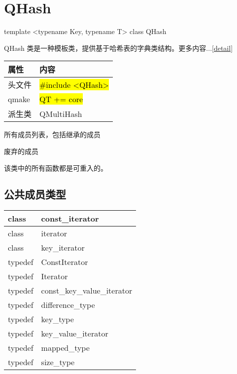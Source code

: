 \chapter{QHash}\label{hash}

template <typename Key, typename T> class QHash

QHash 类是一种模板类，提供基于哈希表的字典类结构。更多内容...\ref{detail}


\begin{tabular}{|l|l|}
\hline
属性& 	内容\\
\hline
头文件& 	\hl{\#include <QHash>}\\
\hline
qmake& 	\hl{QT += core}\\
\hline
派生类& 	QMultiHash\\
\hline
\end{tabular}


\begin{compactitem}
\item 所有成员列表，包括继承的成员
\item 废弃的成员
\end{compactitem}

\begin{notice}
该类中的所有函数都是可重入的。
\end{notice}

\splitLine

\section{公共成员类型}

\begin{tabular}{|m{5em}|m{30em}|}
\hline
class& 	const\_iterator\\
\hline
class& 	iterator\\
\hline
class& 	key\_iterator\\
\hline
typedef& 	ConstIterator\\
\hline
typedef& 	Iterator\\
\hline
typedef& 	const\_key\_value\_iterator\\
\hline
typedef& 	difference\_type\\
\hline
typedef& 	key\_type\\
\hline
typedef& 	key\_value\_iterator\\
\hline
typedef& 	mapped\_type\\
\hline
typedef& 	size\_type\\
\hline
\end{tabular}

